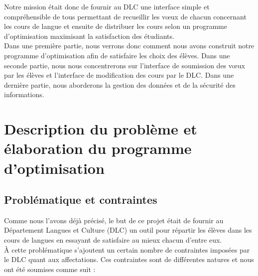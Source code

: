 \documentclass[12pt]{article}
\begin{document}
  Notre mission était donc de fournir au DLC une interface simple et compréhensible de tous permettant de recueillir les vœux de chacun concernant les cours de langue et ensuite de distribuer les cours selon un programme d’optimisation maximisant la satisfaction des étudiants. \\
  
  Dans une première partie, nous verrons donc comment nous avons construit notre programme d’optimisation afin de satisfaire les choix des élèves. Dans une seconde partie, nous nous concentrerons sur l’interface de soumission des vœux par les élèves et l’interface de modification des cours par le DLC. Dans une dernière partie, nous aborderons la gestion des données et de la sécurité des informations. \\
    
    \section{Description du problème et élaboration du programme d’optimisation } 
      \subsection{Problématique et contraintes }
    
      Comme nous l’avons déjà précisé, le but de ce projet était de fournir au Département Langues et Culture (DLC) un outil pour répartir les élèves dans les cours de langues en essayant de satisfaire au mieux chacun d’entre eux.  \\

      À cette problématique s’ajoutent un certain nombre de contraintes imposées par le DLC quant aux affectations. Ces contraintes sont de différentes natures et nous ont été soumises comme suit :  \\
    
\end{document}
